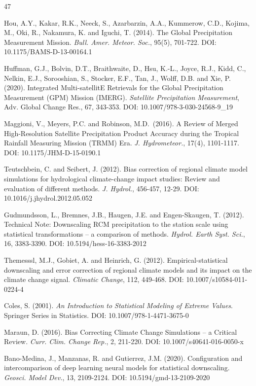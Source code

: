 \documentclass[11pt,a4paper]{article}
\begin{document}
\begin{thebibliography}{47}


 Hou, A.Y., Kakar, R.K., Neeck, S., Azarbarzin, A.A., Kummerow,
C.D., Kojima, M., Oki, R., Nakamura, K. and Iguchi, T. (2014). The
Global Precipitation Measurement Mission. \emph{Bull. Amer. Meteor.
Soc.}, 95(5), 701-722. DOI: 10.1175/BAMS-D-13-00164.1

 Huffman, G.J., Bolvin, D.T., Braithwaite, D., Hsu, K.-L., Joyce,
R.J., Kidd, C., Nelkin, E.J., Sorooshian, S., Stocker, E.F., Tan, J.,
Wolff, D.B. and Xie, P. (2020). Integrated Multi-satellitE Retrievals
for the Global Precipitation Measurement (GPM) Mission (IMERG).
\emph{Satellite Precipitation Measurement}, Adv. Global Change Res., 67,
343-353. DOI: 10.1007/978-3-030-24568-9\_19

 Maggioni, V., Meyers, P.C. and Robinson, M.D.~(2016). A Review
of Merged High-Resolution Satellite Precipitation Product Accuracy
during the Tropical Rainfall Measuring Mission (TRMM) Era. \emph{J.
Hydrometeor.}, 17(4), 1101-1117. DOI: 10.1175/JHM-D-15-0190.1

 Teutschbein, C. and Seibert, J. (2012). Bias correction of
regional climate model simulations for hydrological climate-change
impact studies: Review and evaluation of different methods. \emph{J.
Hydrol.}, 456-457, 12-29. DOI: 10.1016/j.jhydrol.2012.05.052

 Gudmundsson, L., Bremnes, J.B., Haugen, J.E. and Engen-Skaugen,
T. (2012). Technical Note: Downscaling RCM precipitation to the station
scale using statistical transformations -- a comparison of methods.
\emph{Hydrol. Earth Syst. Sci.}, 16, 3383-3390. DOI:
10.5194/hess-16-3383-2012

 Themesssl, M.J., Gobiet, A. and Heinrich, G. (2012).
Empirical-statistical downscaling and error correction of regional
climate models and its impact on the climate change signal.
\emph{Climatic Change}, 112, 449-468. DOI: 10.1007/s10584-011-0224-4

 Coles, S. (2001). \emph{An Introduction to Statistical Modeling
of Extreme Values}. Springer Series in Statistics. DOI:
10.1007/978-1-4471-3675-0

 Maraun, D. (2016). Bias Correcting Climate Change Simulations --
a Critical Review. \emph{Curr. Clim. Change Rep.}, 2, 211-220. DOI:
10.1007/s40641-016-0050-x

 Bano-Medina, J., Manzanas, R. and Gutierrez, J.M. (2020).
Configuration and intercomparison of deep learning neural models for
statistical downscaling. \emph{Geosci. Model Dev.}, 13, 2109-2124. DOI:
10.5194/gmd-13-2109-2020


\end{thebibliography}
\end{document}
